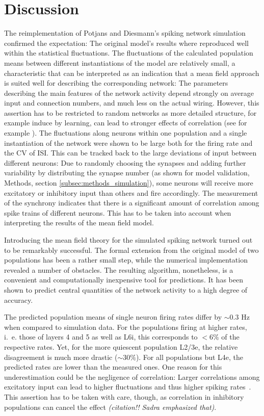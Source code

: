 \section{Discussion}
\label{sec:discussion}

The reimplementation of Potjans and Diesmann's spiking network simulation  
confirmed the expectation: The original model's results where reproduced 
well within the statistical fluctuations. The fluctuations of the calculated population 
means between different instantiations of the model are 
relatively small, a characteristic that can be interpreted as an indication that a mean 
field approach is suited well for describing the corresponding network:
The parameters describing the main features of the network activity
depend strongly on average input and connection numbers,
and much less on the actual wiring.
However, this assertion has to be restricted to 
random networks as more detailed structure, for example induce by learning, 
can lead to stronger effects of correlation (see for example \cite{staude2010higher}).
The fluctuations along neurons within one population and a single instantiation
of the network were shown to be large both for the firing rate and the 
CV of ISI. This can be tracked back to the large deviations of input between 
different neurons: Due to randomly choosing the synapses and adding further 
variability by distributing the synapse number (as shown for model validation, 
Methods, section \ref{subsec:methods_simulation}), 
some neurons will receive more excitatory or inhibitory input than others 
and fire accordingly. 
The measurement of the synchrony indicates that there is a significant 
amount of correlation among spike trains of different neurons. This has to be taken 
into account when interpreting the results of the mean field model. 

Introducing the mean field theory for the simulated spiking network 
turned out to be remarkably successful. 
The formal extension 
from the original model of two populations has been a rather small step, while
the numerical implementation revealed a number of obstacles. The resulting
algorithm, nonetheless, is a convenient and computationally inexpensive tool for 
predictions. It has been shown to predict central quantities 
of the network activity to a high degree of accuracy.  

The predicted population means of single neuron firing rates differ by 
$\sim 0.3$ Hz when compared to simulation data. For the populations firing at 
higher rates, i.~e. those of layers 4 and 5 as well as L6i, this corresponds 
to $<6 \%$ of the respective rates. Yet, for the more quiescent population L2/3e, 
the relative disagreement is much more drastic ($\sim 30 \%$). 
For all populations but L4e, the predicted rates are lower than the measured ones.  
One reason for this underestimation could be the negligence of correlation: 
Larger correlations among excitatory input can lead to higher fluctuations 
and thus higher spiking rates~\cite{staude2010higher}. This 
assertion has to be taken with care, though, as correlation in inhibitory 
populations can cancel the effect \emph{(citation!! Sadra emphasized that)}. 

